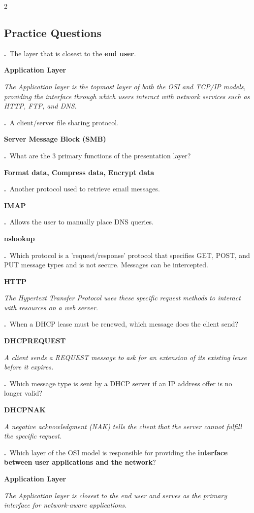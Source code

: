 \documentclass[9pt]{article}
\newcommand{\answer}[1]{%
  \par\nobreak\vspace{1pt}%
  \begin{tcolorbox}[
    colback=AnswerRed,
    colframe=AnswerRed,
    boxrule=0pt,
    arc=0pt,
    left=4pt, right=4pt,
    top=0.5pt, bottom=0.5pt,
    before skip=0pt,
    after skip=0pt
  ]
  {\footnotesize\bfseries\color{white}\RaggedRight #1}
  \end{tcolorbox}
}
\newcommand{\hl}[1]{\textbf{\textcolor{themeColor}{#1}}}
\newcommand{\explain}[1]{%
  \par\nobreak\vspace{0pt}%
  \begin{tcolorbox}[
    colback=LightBlueBg,
    colframe=SoftBlue!30,
    boxrule=0.3pt,
    arc=2pt,
    left=4pt, right=4pt,
    top=1pt, bottom=1pt,
    before skip=1pt,
    after skip=2pt
  ]
  {\footnotesize\color{MutedGray}\RaggedRight\itshape #1}
  \end{tcolorbox}
}
\newcounter{qnum}
\newcommand{\question}[1]{%
  \Needspace{4\baselineskip}%
  \stepcounter{qnum}%
  \par\vspace{3pt}%
  {\footnotesize\bfseries\color{themeColor}\theqnum.}\ {\footnotesize #1}%
}
\newcommand{\questioncolumns}[1]{%
  \begin{multicols}{2}
  \subsection*{Practice Questions}
  #1
  \end{multicols}
}
\begin{document}
\questioncolumns{
\question{The layer that is closest to the \hl{end user}.}

\answer{Application Layer}

\explain{The Application layer is the topmost layer of both the OSI and TCP/IP models, providing the interface through which users interact with network services such as HTTP, FTP, and DNS.}


\question{A client/server file sharing protocol.}

\answer{Server Message Block (SMB)}


\question{What are the 3 primary functions of the presentation layer?}

\answer{Format data, Compress data, Encrypt data}


\question{Another protocol used to retrieve email messages.}

\answer{IMAP}


\question{Allows the user to manually place DNS queries.}

\answer{nslookup}


\question{Which protocol is a 'request/response' protocol that specifies GET, POST, and PUT message types and is not secure. Messages can be intercepted.}

\answer{HTTP}

\explain{The Hypertext Transfer Protocol uses these specific request methods to interact with resources on a web server.}


\question{When a DHCP lease must be renewed, which message does the client send?}

\answer{DHCPREQUEST}

\explain{A client sends a REQUEST message to ask for an extension of its existing lease before it expires.}


\question{Which message type is sent by a DHCP server if an IP address offer is no longer valid?}

\answer{DHCPNAK}

\explain{A negative acknowledgment (NAK) tells the client that the server cannot fulfill the specific request.}


\question{Which layer of the OSI model is responsible for providing the \hl{interface between user applications and the network}?}

\answer{Application Layer}

\explain{The Application layer is closest to the end user and serves as the primary interface for network-aware applications.}


}
\end{document}
